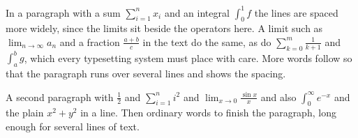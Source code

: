 \documentclass{article}
\begin{document}
In a paragraph with a sum $\sum_{i=1}^n x_i$ and an integral $\int_0^1 f$ the lines are spaced more widely, since the limits sit beside the operators here. A limit such as $\lim_{n\to\infty} a_n$ and a fraction $\frac{a+b}{c}$ in the text do the same, as do $\sum_{k=0}^{m} \frac{1}{k+1}$ and $\int_a^b g$, which every typesetting system must place with care. More words follow so that the paragraph runs over several lines and shows the spacing.

A second paragraph with $\frac{1}{2}$ and $\sum_{i=1}^n i^2$ and $\lim_{x\to 0} \frac{\sin x}{x}$ and also $\int_0^\infty e^{-x}$ and the plain $x^2+y^2$ in a line. Then ordinary words to finish the paragraph, long enough for several lines of text.
\end{document}
